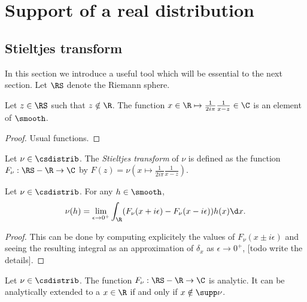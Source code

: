 \section{Support of a real distribution}

\subsection{Stieltjes transform}

In this section we introduce a useful tool which will be essential to the next section.
Let $\RS$ denote the Riemann sphere.

\begin{lemma}
  \label{lem:Stieltjes_function}
  Let $z \in \RS$ such that $z \notin \R$.
  The function $x \in \R \mapsto \frac{1}{2i\pi} \frac{1}{x-z} \in \C$ is
  an element of $\smooth$.
\end{lemma}

\begin{proof}
  Usual functions.
\end{proof}

\begin{definition}
  \label{def:Stieltjes}
  Let $\nu \in \csdistrib$.
  The \emph{Stieltjes transform} of $\nu$ is defined as the function
  $F_\nu : \RS - \R \rightarrow \C$ by $F(z) = \nu(x \mapsto \frac{1}{2 i \pi}\frac{1}{x-z})$.
\end{definition}

\begin{theorem}
  \label{thm:Stieltjes_boundary_values}
  \notready
  Let $\nu \in \csdistrib$.
  For any $h \in \smooth$,
  \begin{equation*}
    \nu(h)
    =
    \lim_{\epsilon \rightarrow 0^+}
    \int_{\R} (F_\nu(x+i \epsilon) - F_\nu(x - i \epsilon)) h(x) \d x.
  \end{equation*}
\end{theorem}

\begin{proof}
  This can be done by computing explicitely the values of $F_\nu(x \pm i \epsilon)$
  and seeing the resulting integral as an approximation of $\delta_x$ as $\epsilon \rightarrow 0^+$,
  [todo write the details].
\end{proof}

\begin{theorem}
  \label{thm:Stieltjes_holomorphic}
  \notready
  Let $\nu \in \csdistrib$.
  The function $F_\nu : \RS - \R \rightarrow \C$ is analytic.
  It can be analytically extended to a $x \in \R$ if and only if $x \notin \supp \nu$.
\end{theorem}

